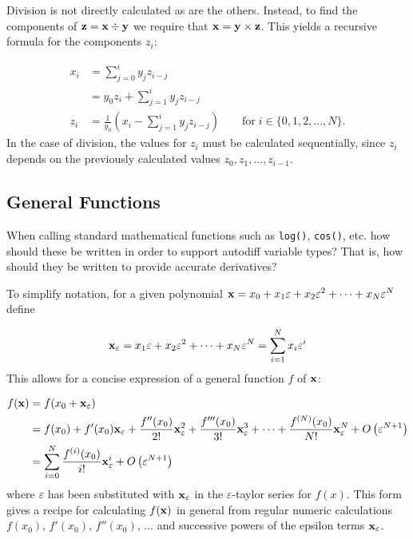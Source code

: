 \documentclass{article}
\begin{document}
Division is not directly calculated as are the others. Instead, to find the components of
${\bf z}={\bf x}\div{\bf y}$ we require that ${\bf x}={\bf y}\times{\bf z}$. This yields
a recursive formula for the components $z_i$:

\begin{align*}
x_i &= \sum_{j=0}^iy_jz_{i-j} \\
 &= y_0z_i + \sum_{j=1}^iy_jz_{i-j} \\
z_i &= \frac{1}{y_0}\left(x_i - \sum_{j=1}^iy_jz_{i-j}\right) \qquad \text{for}\; i\in\{0,1,2,...,N\}.
\end{align*}
In the case of division, the values for $z_i$ must be calculated sequentially, since $z_i$
depends on the previously calculated values $z_0, z_1, ..., z_{i-1}$.

\subsection{General Functions}

When calling standard mathematical functions such as {\tt log()}, {\tt cos()}, etc. how should these be written
in order to support autodiff variable types? That is, how should they be written to provide accurate derivatives?

To simplify notation, for a given polynomial ${\bf x} = x_0 + x_1\varepsilon + x_2\varepsilon^2 +\cdots+
x_N\varepsilon^N$ define

\[
{\bf x}_\varepsilon = x_1\varepsilon + x_2\varepsilon^2 +\cdots+ x_N\varepsilon^N = \sum_{i=1}^Nx_i\varepsilon^i
\]
This allows for a concise expression of a general function $f$ of $\bf x$:

\begin{align*}
f({\bf x}) &= f(x_0 + {\bf x}_\varepsilon) \\
 & = f(x_0) + f'(x_0){\bf x}_\varepsilon + \frac{f''(x_0)}{2!}{\bf x}_\varepsilon^2 + \frac{f'''(x_0)}{3!}{\bf x}_\varepsilon^3 + \cdots + \frac{f^{(N)}(x_0)}{N!}{\bf x}_\varepsilon^N + O\left(\varepsilon^{N+1}\right) \\
 & = \sum_{i=0}^N\frac{f^{(i)}(x_0)}{i!}{\bf x}_\varepsilon^i + O\left(\varepsilon^{N+1}\right)
\end{align*}
where $\varepsilon$ has been substituted with ${\bf x}_\varepsilon$ in the $\varepsilon$-taylor series
for $f(x)$. This form gives a recipe for calculating $f({\bf x})$ in general from regular numeric calculations
$f(x_0)$, $f'(x_0)$, $f''(x_0)$, ... and successive powers of the epsilon terms ${\bf x}_\varepsilon$.
\end{document}
